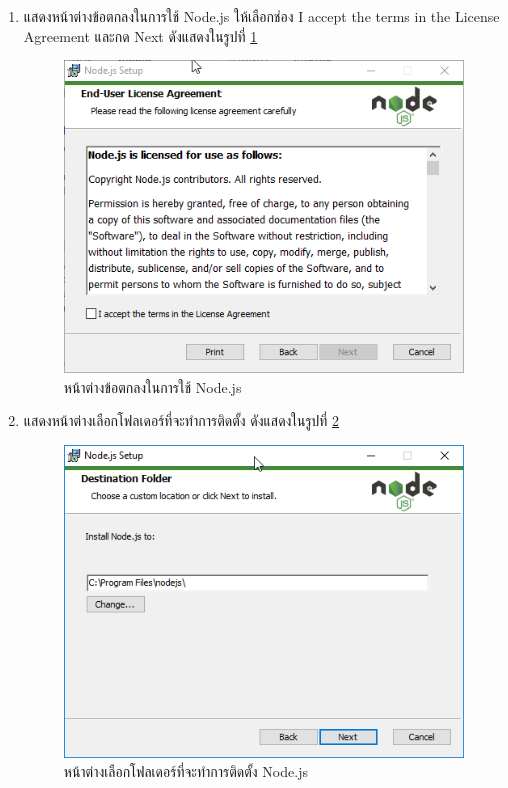 \begin{enumerate}
	\item แสดงหน้าต่างข้อตกลงในการใช้ Node.js ให้เลือกช่อง I accept the terms in the License Agreement และกด Next ดังแสดงในรูปที่ \ref{Fig:nodeInstall4}
	\begin{figure}[H]
		\centering
		\includegraphics[width=0.7\columnwidth]{Figures/7/4}
		\caption{หน้าต่างข้อตกลงในการใช้ Node.js}
		\label{Fig:nodeInstall4}
	\end{figure}
	
	\item แสดงหน้าต่างเลือกโฟลเดอร์ที่จะทำการติดตั้ง ดังแสดงในรูปที่ \ref{Fig:nodeInstall5}
	\begin{figure}[H]
		\centering
		\includegraphics[width=0.7\columnwidth]{Figures/7/5}
		\caption{หน้าต่างเลือกโฟลเดอร์ที่จะทำการติดตั้ง Node.js}
		\label{Fig:nodeInstall5}
	\end{figure}
	

\end{enumerate}
